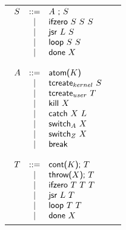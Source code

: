 \documentclass{article}
\begin{document}
\begin{tabular}{cc}
{
\begin{minipage}[t]{2.15in}
$
\begin{array}[t]{lcl}

S &::=& A \ \textsf{;} \ S \\
  & \mid & \textsf {ifzero} \ S \ S \ S\\
  & \mid & \textsf {jsr} \ L \ S\\
  & \mid & \textsf {loop} \ S \ S\\
  & \mid & \textsf {done} \ X\\
  \\
A &::=& \textsf {atom(} K \textsf {)}\\
  &\mid & \textsf{tcreate}_{kernel} \ S\\
  &\mid & \textsf{tcreate}_{user} \ T\\
  &\mid & \textsf{kill} \ X\\
  &\mid & \textsf{catch} \ X \ L\\
  &\mid & \textsf{switch}_{A} \ X\\
  &\mid & \textsf{switch}_{Z} \ X\\
  &\mid & \textsf{break}\\
  \\
T &::=& \textsf{cont(} K\textsf{);} \ T \\
  &\mid & \textsf{throw(} X\textsf{);} \ T \\
  &\mid & \textsf {ifzero} \ T \ T \ T\\
  &\mid & \textsf {jsr} \ L \ T\\
  & \mid & \textsf {loop} \ T \ T\\
  & \mid & \textsf {done} \ X\\

\end{array}
$
\end{minipage}
}


\end{tabular}
\end{document}
